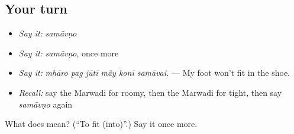 \subsection*{Your turn}
\begin{itemize}
\raggedright
  \item \emph{Say it:} \emph{samāvṇo}
  \item \emph{Say it:} \emph{samāvṇo}, once more
  \item \emph{Say it:} \emph{mhāro pag jūtī mā̃y konī samāvai.} — My foot won't fit in the shoe.
  \item \emph{Recall:} say the Marwadi for roomy, then the Marwadi for tight, then say \emph{samāvṇo} again
\end{itemize}

\begin{tcolorbox}[breakable,colback=teal!4,colframe=teal!35!black,title={Before you move on}]
What does  mean? (\textquotedblleft{}To fit (into)\textquotedblright{}.) Say it once more.
\end{tcolorbox}
